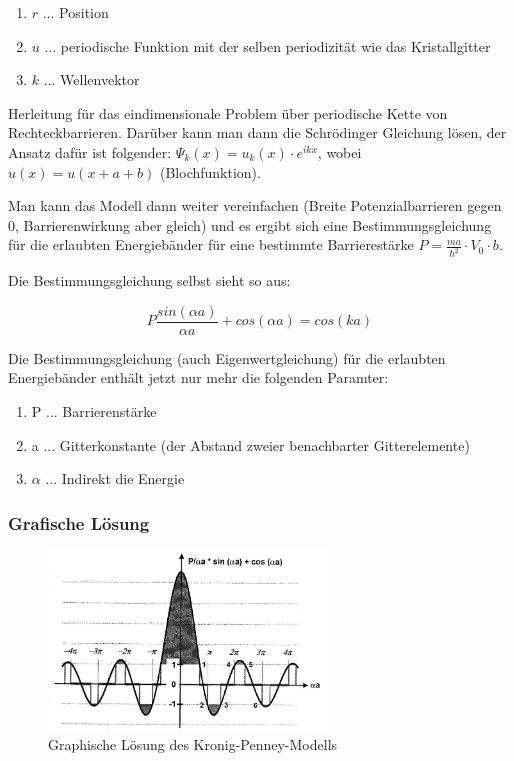 \begin{enumerate}
    \item $r$ ... Position
    \item $u$ ... periodische Funktion mit der selben periodizität wie das Kristallgitter
    \item $k$ ... Wellenvektor
\end{enumerate}

Herleitung für das eindimensionale Problem über periodische Kette von Rechteckbarrieren. Darüber kann man dann die Schrödinger Gleichung lösen, der Ansatz dafür ist folgender: $\Psi_k(x) = u_k(x)\cdot e^{ikx}$, wobei $u(x) = u(x+a+b)$ (Blochfunktion).

Man kann das Modell dann weiter vereinfachen (Breite Potenzialbarrieren gegen 0, Barrierenwirkung aber gleich) und es ergibt sich eine Bestimmungsgleichung  für die erlaubten Energiebänder für eine bestimmte Barrierestärke $P = \frac{ma}{\hbar^2} \cdot V_0 \cdot b$.

Die Bestimmungsgleichung selbst sieht so aus: 

\begin{equation}
    P\frac{sin(\alpha a)}{\alpha a} + cos(\alpha a) = cos(ka)
\end{equation}

Die Bestimmungsgleichung (auch Eigenwertgleichung) für die erlaubten Energiebänder enthält jetzt nur mehr die folgenden Paramter:

\begin{enumerate}
    \item P ... Barrierenstärke
    \item a ... Gitterkonstante (der Abstand zweier benachbarter Gitterelemente)
    \item $\alpha$ ... Indirekt die Energie
\end{enumerate}

\subsubsection{Grafische Lösung}
\begin{figure}
    \centering
    \includegraphics[width=0.66\textwidth]{fig/krong-penney-grafisch.jpg}
    \caption{Graphische Lösung des Kronig-Penney-Modells}
    \label{fig:kronig-penney-grafisch}
\end{figure}



